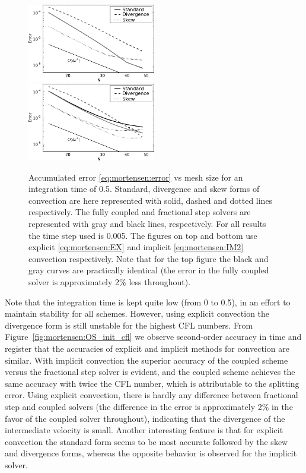 \begin{figure}
 \includegraphics[width=0.5\textwidth]{chapters/mortensen/pdf/OS_init_dx_1.pdf}
 \includegraphics[width=0.5\textwidth]{chapters/mortensen/pdf/OS_init_dx_0.pdf}
%
 \caption{Accumulated error \eqref{eq:mortensen:error} vs mesh size
   for an integration time of 0.5. Standard, divergence and skew forms
   of convection are here represented with solid, dashed and dotted
   lines respectively. The fully coupled and fractional step solvers
   are represented with gray and black lines, respectively. For all
   results the time step used is 0.005. The figures on top and bottom
   use explicit \eqref{eq:mortensen:EX} and implicit \eqref{eq:mortensen:IM2}
   convection respectively. Note that for the top figure the black and
   gray curves are practically identical (the error in the fully
   coupled solver is approximately 2\% less throughout). }
\label{fig:mortensen:OS_init_dx}
\end{figure}
Note that the integration time is kept quite low (from 0 to 0.5), in an
effort to maintain stability for all schemes. However, using explicit
convection the divergence form is still unstable for the highest
CFL numbers. From Figure~\ref{fig:mortensen:OS_init_cfl} we observe
second-order accuracy in time and register that the accuracies of explicit
and implicit methods for convection are similar. With
implicit convection the superior accuracy of the coupled scheme versus the
fractional step solver is evident, and the coupled scheme achieves the same
accuracy with twice the CFL number, which is attributable to
the splitting error. Using explicit convection, there is hardly any
difference between fractional step and coupled solvers (the difference
in the error is approximately 2\% in the favor of the coupled solver
throughout), indicating that the divergence of the intermediate velocity
is small. Another interesting feature is that for explicit convection
the standard form seems to be most accurate followed by the skew and
divergence forms, whereas the opposite behavior is observed for
the implicit solver.

